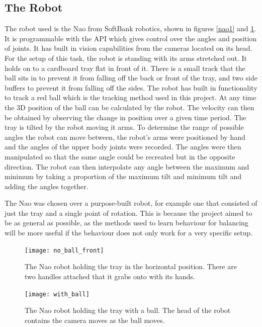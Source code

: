 \documentclass[12pt,a4paper]{article}
\begin{document}
\subsection{The Robot}
The robot used is the Nao from SoftBank robotics, shown in figures \ref{nao1} and \ref{nao2}. It is programmable with the API which gives control over the angles and position of joints. It has built in vision capabilities from the cameras located on its head. For the setup of this task, the robot is standing with its arms stretched out. It holds on to a cardboard tray flat in front of it. There is a small track that the ball sits in to prevent it from falling off the back or front of the tray, and two side buffers to prevent it from falling off the sides. The robot has built in functionality to track a red ball which is the tracking method used in this project. At any time the 3D position of the ball can be calculated by the robot. The velocity can then be obtained by observing the change in position over a given time period. The tray is tilted by the robot moving it arms. To determine the range of possible angles the robot can move between, the robot's arms were positioned by hand and the angles of the upper body joints were recorded. The angles were then manipulated so that the same angle could be recreated but in the opposite direction. The robot can then interpolate any angle between the maximum and minimum by taking a proportion of the maximum tilt and minimum tilt and adding the angles together.

The Nao was chosen over a purpose-built robot, for example one that consisted of just the tray and a single point of rotation. This is because the project aimed to be as general as possible, as the methods used to learn behaviour for balancing will be more useful if the behaviour does not only work for a very specific setup. 


\begin{figure}[H]
\centering
\begin{minipage}[t]{.45\textwidth}
  \centering
  \texttt{[image: no\_ball\_front]}
  \caption{The Nao robot holding the tray in the horizontal position. There are two handles attached that it grabs onto with its hands.}
  \label{nao1}
\end{minipage}\quad
\begin{minipage}[t]{.45\textwidth}
  \centering
  \texttt{[image: with\_ball]}
  \caption{The Nao robot holding the tray with a ball. The head of the robot contains the camera moves as the ball moves.}
  \label{nao2}
\end{minipage}
\end{figure}
\end{document}

